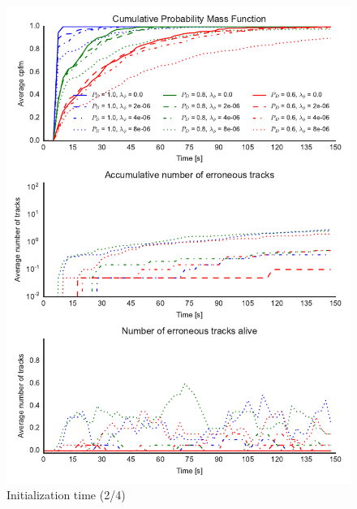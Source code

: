 \begin{figure}
\centering
\includegraphics{Figures/plots/Scenario1_Init-Time(2-4).pdf}
\caption{Initialization time (2/4)}\label{fig:init_time_2-4}
\end{figure}

